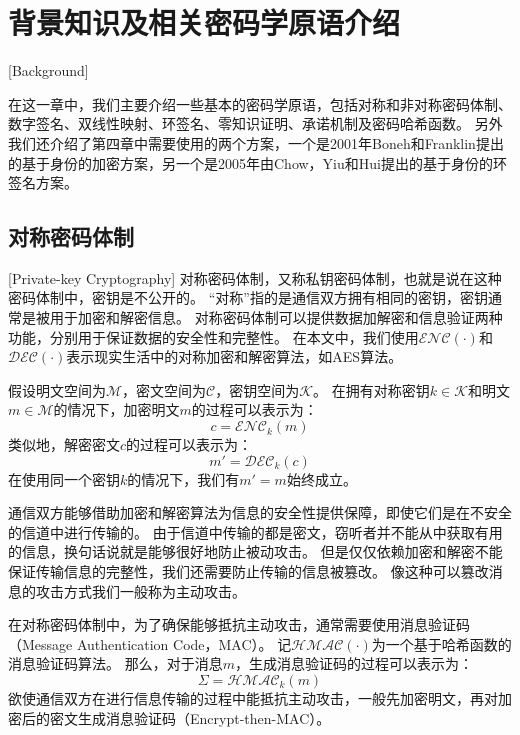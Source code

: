 

\chapter{背景知识及相关密码学原语介绍}[Background]

在这一章中，我们主要介绍一些基本的密码学原语，包括对称和非对称密码体制、数字签名、双线性映射、环签名、零知识证明、承诺机制及密码哈希函数。
另外我们还介绍了第四章中需要使用的两个方案，一个是2001年Boneh和Franklin提出的基于身份的加密方案\cite{boneh2001identity}，另一个是2005年由Chow，Yiu和Hui提出的基于身份的环签名方案\cite{chow2005efficient}。

\section{对称密码体制}[Private-key Cryptography]
对称密码体制，又称私钥密码体制，也就是说在这种密码体制中，密钥是不公开的。
“对称”指的是通信双方拥有相同的密钥，密钥通常是被用于加密和解密信息。
对称密码体制可以提供数据加解密和信息验证两种功能，分别用于保证数据的安全性和完整性。
在本文中，我们使用$\mathcal{ENC}(\cdot)$和$\mathcal{DEC}(\cdot)$表示现实生活中的对称加密和解密算法，如AES算法。

假设明文空间为$\mathcal{M}$，密文空间为$\mathcal{C}$，密钥空间为$\mathcal{K}$。
在拥有对称密钥$k\in\mathcal{K}$和明文$m\in\mathcal{M}$的情况下，加密明文$m$的过程可以表示为：
\begin{equation}
c=\mathcal{ENC}_k(m)
\end{equation}
类似地，解密密文$c$的过程可以表示为：
\begin{equation}
m'=\mathcal{DEC}_k(c)
\end{equation}
在使用同一个密钥$k$的情况下，我们有$m'=m$始终成立。

通信双方能够借助加密和解密算法为信息的安全性提供保障，即使它们是在不安全的信道中进行传输的。
由于信道中传输的都是密文，窃听者并不能从中获取有用的信息，换句话说就是能够很好地防止被动攻击。
但是仅仅依赖加密和解密不能保证传输信息的完整性，我们还需要防止传输的信息被篡改。
像这种可以篡改消息的攻击方式我们一般称为主动攻击。

在对称密码体制中，为了确保能够抵抗主动攻击，通常需要使用消息验证码（Message Authentication Code，MAC）。
记$\mathcal{HMAC}(\cdot)$为一个基于哈希函数的消息验证码算法。
那么，对于消息$m$，生成消息验证码的过程可以表示为：
\begin{equation}
\Sigma=\mathcal{HMAC}_k(m)
\end{equation}
欲使通信双方在进行信息传输的过程中能抵抗主动攻击，一般先加密明文，再对加密后的密文生成消息验证码（Encrypt-then-MAC）\cite{krawczyk2001order}。

